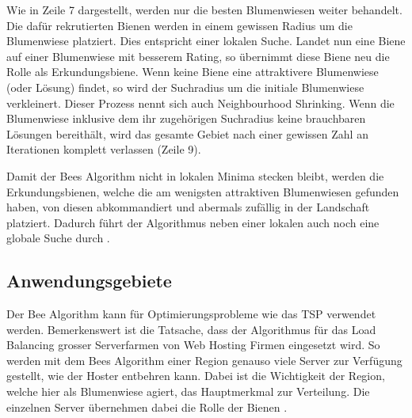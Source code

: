 Wie in Zeile 7 dargestellt, werden nur die besten Blumenwiesen weiter behandelt. Die dafür rekrutierten Bienen
werden in einem gewissen Radius um die Blumenwiese platziert. Dies entspricht einer lokalen Suche. Landet nun eine
Biene auf einer Blumenwiese mit besserem Rating, so übernimmt diese Biene neu die Rolle als Erkundungsbiene. Wenn
keine Biene eine attraktivere Blumenwiese (oder Lösung) findet, so wird der Suchradius um die initiale Blumenwiese
verkleinert. Dieser Prozess nennt sich auch Neighbourhood Shrinking. Wenn die Blumenwiese inklusive dem ihr zugehörigen
Suchradius keine brauchbaren Lösungen bereithält, wird das gesamte Gebiet nach einer gewissen Zahl an Iterationen
komplett verlassen (Zeile 9).

Damit der Bees Algorithm nicht in lokalen Minima stecken bleibt, werden die Erkundungsbienen, welche die am wenigsten
attraktiven Blumenwiesen gefunden haben, von diesen abkommandiert und abermals zufällig in der Landschaft platziert.
Dadurch führt der Algorithmus neben einer lokalen auch noch eine globale Suche durch \cite{Wiki08}.

\subsection{Anwendungsgebiete}

Der Bee Algorithm kann für Optimierungsprobleme wie das TSP \cite{Wiki05} verwendet werden. Bemerkenswert ist die Tatsache,
dass der Algorithmus für das Load Balancing grosser Serverfarmen von Web Hosting Firmen eingesetzt wird. So werden mit dem
Bees Algorithm einer Region genauso viele Server zur Verfügung gestellt, wie der Hoster entbehren kann. Dabei ist die
Wichtigkeit der Region, welche hier als Blumenwiese agiert, das Hauptmerkmal zur Verteilung. Die einzelnen Server übernehmen
dabei die Rolle der Bienen \cite{You}.